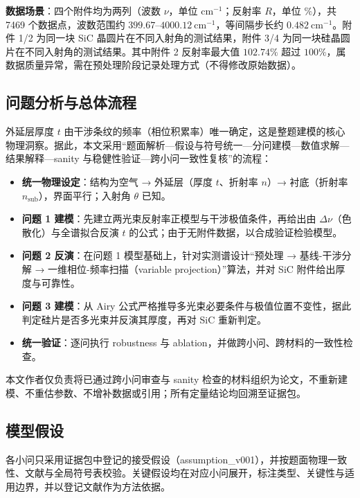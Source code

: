 \textbf{数据场景}：四个附件均为两列（波数 \(\nu\)，单位
\(\mathrm{cm}^{-1}\)；反射率 \(R\)，单位 \(\%\)），共 7469
个数据点，波数范围约
\(399.67\)--\(4000.12\ \mathrm{cm}^{-1}\)，等间隔步长约
\(0.482\ \mathrm{cm}^{-1}\)。附件 1/2 为同一块 SiC
晶圆片在不同入射角的测试结果，附件 3/4
为同一块硅晶圆片在不同入射角的测试结果。其中附件 2 反射率最大值
\(102.74\%\) 超过
\(100\%\)，属数据质量异常，需在预处理阶段记录处理方式（不得修改原始数据）。

\subsection{问题分析与总体流程}\label{ux95eeux9898ux5206ux6790ux4e0eux603bux4f53ux6d41ux7a0b}

外延层厚度 \(t\)
由干涉条纹的频率（相位积累率）唯一确定，这是整题建模的核心物理洞察。据此，本文采用``题面解析---假设与符号统一---分问建模---数值求解---结果解释---sanity
与稳健性验证---跨小问一致性复核''的流程：

\begin{itemize}
\tightlist
\item
  \textbf{统一物理设定}：结构为空气 → 外延层（厚度 \(t\)、折射率
  \(n\)）→ 衬底（折射率 \(n_{\mathrm{sub}}\)），界面平行；入射角
  \(\theta\) 已知。
\item
  \textbf{问题 1 建模}：先建立两光束反射率正模型与干涉极值条件，再给出由
  \(\Delta\nu\)（色散化）与全谱拟合反演 \(t\)
  的公式；由于无附件数据，以合成验证检验模型。
\item
  \textbf{问题 2 反演}：在问题 1 模型基础上，针对实测谱设计``预处理 →
  基线-干涉分解 → 一维相位-频率扫描（variable projection）''算法，并对
  SiC 附件给出厚度与可靠性。
\item
  \textbf{问题 3 建模}：从 Airy
  公式严格推导多光束必要条件与极值位置不变性，据此判定硅片是否多光束并反演其厚度，再对
  SiC 重新判定。
\item
  \textbf{统一验证}：逐问执行 robustness 与
  ablation，并做跨小问、跨材料的一致性检查。
\end{itemize}

本文作者仅负责将已通过跨小问审查与 sanity
检查的材料组织为论文，不重新建模、不重估参数、不增补数据或引用；所有定量结论均回溯至证据包。

\subsection{模型假设}\label{ux6a21ux578bux5047ux8bbe}

各小问只采用证据包中登记的接受假设（assumption\_v001），并按题面物理一致性、文献与全局符号表校验。关键假设均在对应小问展开，标注类型、关键性与适用边界，并以登记文献作为方法依据。

